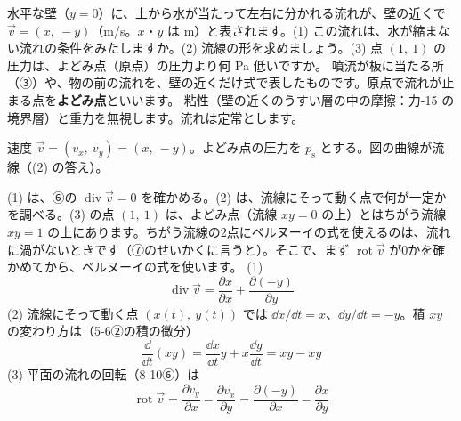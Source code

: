 \begin{phreidai}
\label{ph:力-13:ex15}水平な壁（$y=0$）に、上から水が当たって左右に分かれる流れが、壁の近くで $\vec{v}=(x,\ -y)$（m/s。$x$・$y$ は m）と表されます。(1) この流れは、水が縮まない流れの条件をみたしますか。(2) 流線の形を求めましょう。(3) 点 $(1,\ 1)$ の圧力は、よどみ点（原点）の圧力より何 Pa 低いですか。
\phbamen
噴流が板に当たる所（③）や、物の前の流れを、壁の近くだけ式で表したものです。原点で流れが止まる点を\textbf{よどみ点}といいます。
\phmushi
粘性（壁の近くのうすい層の中の摩擦：力-15 の境界層）と重力を無視します。流れは定常とします。
\phzu
\noindent\begin{minipage}[c]{0.40\linewidth}\centering
{}
\end{minipage}\hfill
\begin{minipage}[c]{0.57\linewidth}\raggedright
速度 $\vec{v}=(v_x,\ v_y)=(x,\ -y)$。よどみ点の圧力を $p_{\mathrm s}$ とする。図の曲線が流線（(2) の答え）。
\end{minipage}
\phriyu
(1) は、⑥の $\operatorname{div}\vec{v}=0$ を確かめる。(2) は、流線にそって動く点で何が一定かを調べる。(3) の点 $(1,\ 1)$ は、よどみ点（流線 $xy=0$ の上）とはちがう流線 $xy=1$ の上にあります。ちがう流線の2点にベルヌーイの式を使えるのは、流れに渦がないときです（⑦のせいかくに言うと）。そこで、まず $\operatorname{rot}\vec v$ が0かを確かめてから、ベルヌーイの式を使います。
\phtateru
(1)
\[ \operatorname{div}\vec{v}=\frac{\partial x}{\partial x}+\frac{\partial(-y)}{\partial y} \]
(2) 流線にそって動く点 $(x(t),\ y(t))$ では $\dd x/\dd t=x$、$\dd y/\dd t=-y$。積 $xy$ の変わり方は（5-6②の積の微分）
\[ \frac{\dd}{\dd t}(xy)=\frac{\dd x}{\dd t}y+x\frac{\dd y}{\dd t}=xy-xy \]
(3) 平面の流れの回転（8-10⑥）は
\[ \operatorname{rot}\vec v=\frac{\partial v_y}{\partial x}-\frac{\partial v_x}{\partial y}=\frac{\partial(-y)}{\partial x}-\frac{\partial x}{\partial y} \]

\end{phreidai}
